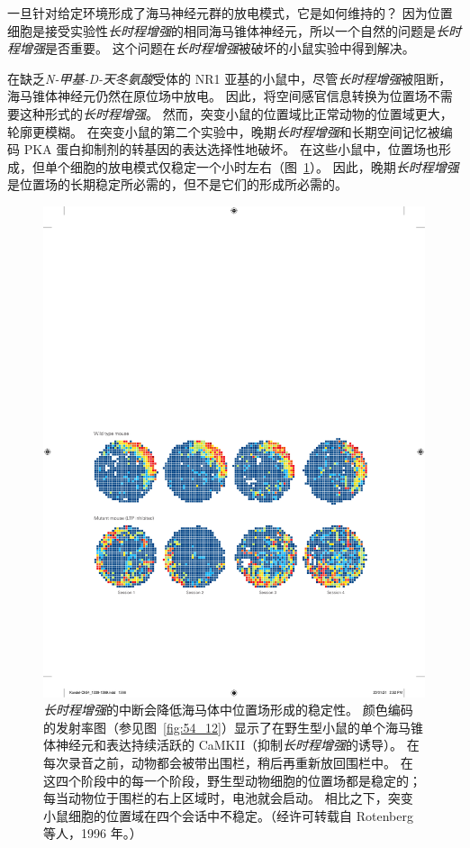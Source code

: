 一旦针对给定环境形成了海马神经元群的放电模式，它是如何维持的？
因为位置细胞是接受实验性\textit{长时程增强}的相同海马锥体神经元，所以一个自然的问题是\textit{长时程增强}是否重要。
这个问题在\textit{长时程增强}被破坏的小鼠实验中得到解决。


在缺乏\textit{N-甲基-D-天冬氨酸}受体的 NR1 亚基的小鼠中，尽管\textit{长时程增强}被阻断，海马锥体神经元仍然在原位场中放电。
因此，将空间感官信息转换为位置场不需要这种形式的\textit{长时程增强}。
然而，突变小鼠的位置域比正常动物的位置域更大，轮廓更模糊。
在突变小鼠的第二个实验中，晚期\textit{长时程增强}和长期空间记忆被编码 PKA 蛋白抑制剂的转基因的表达选择性地破坏。
在这些小鼠中，位置场也形成，但单个细胞的放电模式仅稳定一个小时左右（图~\ref{fig:54_16}）。
因此，晚期\textit{长时程增强}是位置场的长期稳定所必需的，但不是它们的形成所必需的。


\begin{figure}[htbp]
	\centering
	\includegraphics[width=0.9\linewidth]{chap54/fig_54_16}
	\caption{\textit{长时程增强}的中断会降低海马体中位置场形成的稳定性。
		颜色编码的发射率图（参见图~\ref{fig:54_12}）显示了在野生型小鼠的单个海马锥体神经元和表达持续活跃的 CaMKII（抑制\textit{长时程增强}的诱导）。
		在每次录音之前，动物都会被带出围栏，稍后再重新放回围栏中。
		在这四个阶段中的每一个阶段，野生型动物细胞的位置场都是稳定的；
		每当动物位于围栏的右上区域时，电池就会启动。
		相比之下，突变小鼠细胞的位置域在四个会话中不稳定。（经许可转载自 Rotenberg 等人，1996 年。）}
	\label{fig:54_16}
\end{figure}



